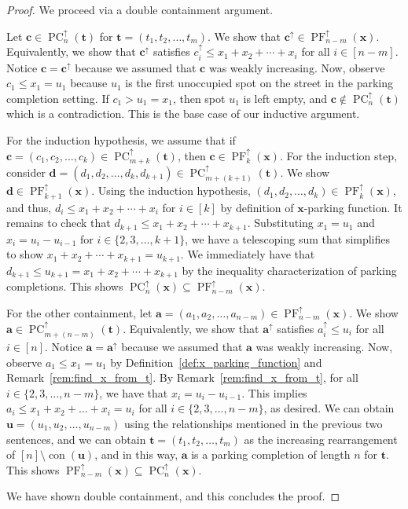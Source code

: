 \documentclass[10pt,a4paper]{amsart}
\newcommand{\PC}{\operatorname{PC}} %
\newcommand{\PF}{\operatorname{PF}} %
\begin{document}
\begin{proof}
    We proceed via a double containment argument.

    Let $\mathbf{c} \in \PC_n^\uparrow(\mathbf{t})$ for $\mathbf{t} = (t_1, t_2, \hdots, t_m)$.
    We show that $\mathbf{c}^\uparrow \in \PF_{n-m}^\uparrow(\mathbf{x})$.
    Equivalently, we show that $\mathbf{c}^\uparrow$ satisfies $c_i^\uparrow \leq x_1 + x_2 + \cdots + x_i$ for all $i \in [n-m]$.
    Notice $\mathbf{c} = \mathbf{c}^\uparrow$ because we assumed that $\mathbf{c}$ was weakly increasing.
    Now, observe $c_1 \leq x_1 = u_1$ because $u_1$ is the first unoccupied spot on the street in the parking completion setting.
    If $c_1 > u_1 = x_1$, then spot $u_1$ is left empty, and $\mathbf{c} \notin \PC_{n}^\uparrow(\mathbf{t})$ which is a contradiction.
    This is the base case of our inductive argument.
    
    For the induction hypothesis, we assume that if $\mathbf{c} = (c_1, c_2, \hdots, c_k) \in \PC_{m+k}^\uparrow(\mathbf{t})$, then $\mathbf{c} \in \PF_{k}^\uparrow(\mathbf{x})$.
    For the induction step, consider $\mathbf{d} = (d_1, d_2, \hdots, d_k, d_{k+1}) \in \PC_{m+(k+1)}^\uparrow(\mathbf{t})$.
    We show $\mathbf{d} \in \PF_{k+1}^\uparrow(\mathbf{x})$.
    Using the induction hypothesis, $(d_1, d_2, \hdots, d_k) \in \PF_{k}^\uparrow(\mathbf{x})$, and thus, $d_i \leq x_1 + x_2 + \cdots + x_i$ for $i \in [k]$ by definition of $\mathbf{x}$-parking function.
    It remains to check that $d_{k+1} \leq x_1 + x_2 + \cdots + x_{k+1}$.
    Substituting $x_1 = u_1$ and $x_i = u_{i} - u_{i-1}$ for $i \in \{2, 3, \ldots, k+1\}$, we have a telescoping sum that simplifies to show $x_1 + x_2 + \cdots + x_{k+1} = u_{k+1}$.
    We immediately have that $d_{k+1} \leq u_{k+1} = x_1 + x_2 + \cdots + x_{k+1}$ by the inequality characterization of parking completions.
    This shows $\PC_{n}^\uparrow(\mathbf{x}) \subseteq \PF_{n-m}^\uparrow(\mathbf{x})$.

    For the other containment, let $\mathbf{a} = (a_1, a_2, \hdots, a_{n-m}) \in \PF_{n-m}^\uparrow(\mathbf{x})$.
    We show $\mathbf{a} \in \PC_{m+(n-m)}^\uparrow(\mathbf{t})$.
    Equivalently, we show that $\mathbf{a}^\uparrow$ satisfies $a_i^{\uparrow} \leq u_i$ for all $i \in [n]$.
    Notice $\mathbf{a} = \mathbf{a}^\uparrow$ because we assumed that $\mathbf{a}$ was weakly increasing.
    Now, observe $a_1 \leq x_1 = u_1$ by Definition~\ref{def:x_parking_function} and Remark~\ref{rem:find_x_from_t}.
    By Remark~\ref{rem:find_x_from_t}, for all $i \in \{2, 3, \hdots, n-m\}$, we have that $x_i = u_i - u_{i-1}$.
    This implies $a_i \leq x_1 + x_2 + \hdots + x_i = u_i$ for all $i \in \{ 2, 3, \hdots, n-m \}$, as desired.
    We can obtain $\mathbf{u} = (u_1, u_2, \hdots, u_{n-m})$ using the relationships mentioned in the previous two sentences, and we can obtain $\mathbf{t} = (t_1, t_2, \hdots, t_m)$ as the increasing rearrangement of $[n] \setminus \operatorname{con}(\mathbf{u})$, and in this way, $\mathbf{a}$ is a parking completion of length $n$ for $\mathbf{t}$.
    This shows $\PF_{n-m}^\uparrow(\mathbf{x}) \subseteq \PC_{n}^\uparrow(\mathbf{x})$.

    We have shown double containment, and this concludes the proof.
\end{proof}
\end{document}
